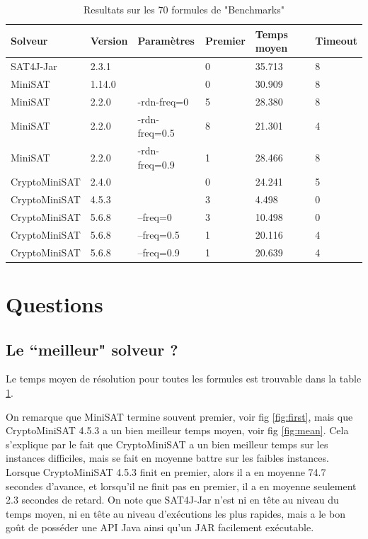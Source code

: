 \documentclass[11pt,a4paper]{article}
\begin{document}
\begin{table}[]
\begin{tabular}{|l|l|l|l|l|l|}
\hline
Solveur       & Version & Paramètres    & Premier & Temps moyen        & Timeout \\ \hline
SAT4J-Jar     & 2.3.1   &               & 0       & 35.713  & 8       \\
MiniSAT       & 1.14.0  &               & 0       & 30.909  & 8       \\
MiniSAT       & 2.2.0   & -rdn-freq=0   & 5       & 28.380 & 8       \\
MiniSAT       & 2.2.0   & -rdn-freq=0.5 & 8       & 21.301 & 4       \\
MiniSAT       & 2.2.0   & -rdn-freq=0.9 & 1       & 28.466 & 8       \\
CryptoMiniSAT & 2.4.0   &               & 0       & 24.241 & 5       \\
CryptoMiniSAT & 4.5.3   &               & 3       & 4.498  & 0       \\
CryptoMiniSAT & 5.6.8   & --freq=0      & 3       & 10.498 & 0       \\
CryptoMiniSAT & 5.6.8   & --freq=0.5    & 1       & 20.116 & 4       \\
CryptoMiniSAT & 5.6.8   & --freq=0.9    & 1       & 20.639 & 4       \\ \hline
\end{tabular}
\caption{Resultats sur les 70 formules de "Benchmarks"}
\label{tab:results}
\end{table}


\section{Questions}

\subsection{Le ``meilleur" solveur ?}

Le temps moyen de résolution pour toutes les formules est trouvable dans la table \ref{tab:results}.


On remarque que MiniSAT termine souvent premier, voir fig \ref{fig:first}, mais que CryptoMiniSAT 4.5.3 a un bien meilleur temps moyen, voir fig \ref{fig:mean}. Cela s'explique par le fait que CryptoMiniSAT a un bien meilleur temps sur les instances difficiles, mais se fait en moyenne battre sur les faibles instances.
Lorsque CryptoMiniSAT 4.5.3 finit en premier, alors il a en moyenne 74.7 secondes d'avance, et lorsqu'il ne finit pas en premier, il a en moyenne seulement 2.3 secondes de retard.
On note que SAT4J-Jar n'est ni en tête au niveau du temps moyen, ni en tête au niveau d'exécutions les plus rapides, mais a le bon goût de posséder une API Java ainsi qu'un JAR facilement exécutable.
\end{document}

